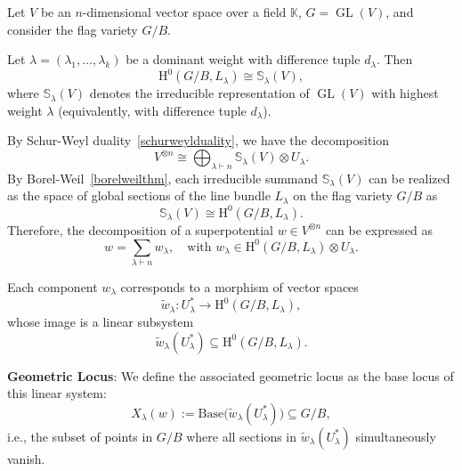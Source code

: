 \documentclass{amsart}
\DeclareMathOperator{\GL}{GL}
\begin{document}

Let $V$ be an $n$-dimensional vector space over a field $\mathbb{K}$, $G = \GL(V)$, and consider the flag variety $G/B$.

\begin{theorem}\label{borelweilthm}

Let \( \lambda = (\lambda_1, \ldots, \lambda_k) \) be a dominant weight with difference tuple $d_\lambda.$ Then
$$\mathrm{H}^0(G/B, L_{\lambda}) \cong \mathbb{S}_{\lambda}(V),$$
where \( \mathbb{S}_\lambda(V) \) denotes the irreducible representation of \( \GL(V) \) with highest weight \( \lambda \) (equivalently, with difference tuple \( d_\lambda \)).

\end{theorem}

By Schur-Weyl duality~\ref{schurweylduality}, we have the decomposition
\[
V^{\otimes n} \cong \bigoplus_{\lambda \vdash n} \mathbb{S}_\lambda(V) \otimes U_\lambda.
\]
By Borel-Weil~\ref{borelweilthm}, each irreducible summand \( \mathbb{S}_\lambda(V) \) can be realized as the space of global sections of the line bundle $L_\lambda$ on the flag variety \( G/B \) as
\[
\mathbb{S}_\lambda(V) \cong \mathrm{H}^0(G/B, L_\lambda).
\]
Therefore, the decomposition of a superpotential \( w \in V^{\otimes n} \) can be expressed as
\[
w = \sum_{\lambda \vdash n} w_\lambda, \quad \text{with } w_\lambda \in \mathrm{H}^0(G/B, L_\lambda) \otimes U_\lambda.
\]

Each component \( w_\lambda \) corresponds to a morphism of vector spaces
\[
\widetilde{w}_\lambda : U_\lambda^* \to \mathrm{H}^0(G/B, L_\lambda),
\]
whose image is a linear subsystem
\[
\widetilde{w}_\lambda(U_\lambda^*) \subseteq \mathrm{H}^0(G/B, L_\lambda).
\]

\begin{definition}\label{def:Xlambda}
\textbf{Geometric Locus}:
We define the associated geometric locus as the base locus of this linear system:
\[
X_\lambda(w) := \mathrm{Base}\big(\widetilde{w}_\lambda(U_\lambda^*)\big) \subseteq G/B,
\]
i.e., the subset of points in \( G/B \) where all sections in \( \widetilde{w}_\lambda(U_\lambda^*) \) simultaneously vanish.
\end{definition}
\end{document}
